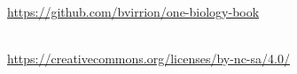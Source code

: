 \thispagestyle{empty}
\vspace*{\fill}
\begin{center}
\omcolophonsource\\[2pt]
\url{https://github.com/bvirrion/one-biology-book}

\bigskip
\omcolophonlicense\\[2pt]
\url{https://creativecommons.org/licenses/by-nc-sa/4.0/}\\[6pt]
\omcolophoncredit
\end{center}
\vspace*{\fill}
\clearpage
